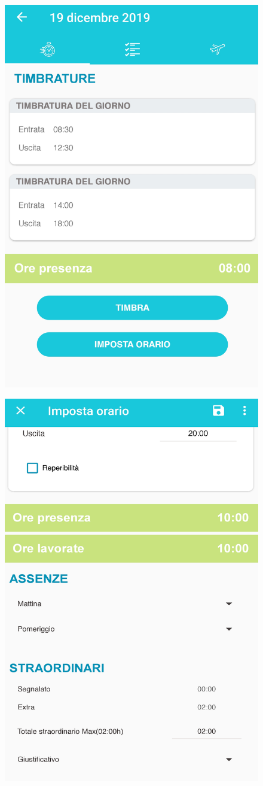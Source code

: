 \documentclass[12pt]{report}
\begin{document}
\begin{multicols}{2}
 \begin{figure}[H]
	\centering
	\includegraphics[width=0.8\linewidth]{immagini/timbrature}
	\caption{}
	\label{fig:timbrature}
\end{figure}
\begin{figure}[H]
	\centering
	\includegraphics[width=0.8\linewidth]{immagini/timbrature_dettaglio}

\end{figure}
\end{multicols}
\end{document}
